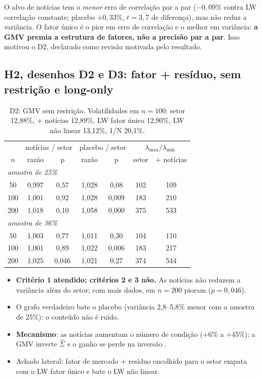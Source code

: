 \documentclass[11pt,a4paper]{article}
\newcommand{\Sig}{\hat\Sigma}
\begin{document}
O alvo de notícias tem o \emph{menor} erro de correlação par a par ($-0{,}09\%$ contra LW correlação
constante; placebo $+0{,}33\%$, $t=3{,}7$ de diferença), mas não reduz a variância. O fator único é o pior
em erro de correlação e o melhor em variância: \textbf{a GMV premia a estrutura de fatores, não a
precisão par a par}. Isso motivou o D2, declarado como revisão motivada pelo resultado.

\subsection{H2, desenhos D2 e D3: fator + resíduo, sem restrição e long-only}

\begin{table}[h]
\centering\small
\begin{tabular}{ccccccc}
\toprule
& \multicolumn{2}{c}{notícias / setor} & \multicolumn{2}{c}{placebo / setor} & \multicolumn{2}{c}{$\lambda_{\max}/\lambda_{\min}$} \\
$n$ & razão & p & razão & p & setor & + notícias \\
\midrule
\multicolumn{7}{l}{\emph{amostra de 25\%}} \\
50 & 0,997 & 0,57 & 1,028 & 0,08 & 102 & 109 \\
100 & 1,001 & 0,92 & 1,028 & 0,009 & 183 & 210 \\
200 & 1,018 & 0,10 & 1,058 & 0,000 & 375 & 533 \\
\multicolumn{7}{l}{\emph{amostra de 36\%}} \\
50 & 1,003 & 0,77 & 1,011 & 0,30 & 104 & 110 \\
100 & 1,001 & 0,89 & 1,022 & 0,006 & 183 & 217 \\
200 & 1,025 & 0,046 & 1,021 & 0,27 & 374 & 544 \\
\bottomrule
\end{tabular}
\caption{D2: GMV sem restrição. Volatilidades em $n=100$: setor 12,88\%, + notícias 12,89\%, LW fator único 12,90\%, LW não linear 13,12\%, 1/N 20,1\%.}
\end{table}

\begin{itemize}
  \item \textbf{Critério 1 atendido; critérios 2 e 3 não.} As notícias não reduzem a variância além do setor;
        com mais dados, em $n=200$ pioram ($p=0{,}046$).
  \item O grafo verdadeiro bate o placebo (variância 2,8--5,8\% menor com a amostra de 25\%): o conteúdo não é ruído.
  \item \textbf{Mecanismo}: as notícias aumentam o número de condição (+6\% a +45\%); a GMV inverte $\Sig$ e
        o ganho se perde na inversão \citep{lopezdeprado2016}.
  \item Achado lateral: fator de mercado + resíduo encolhido para o setor empata com o LW fator único
        e bate o LW não linear.
\end{itemize}
\end{document}
